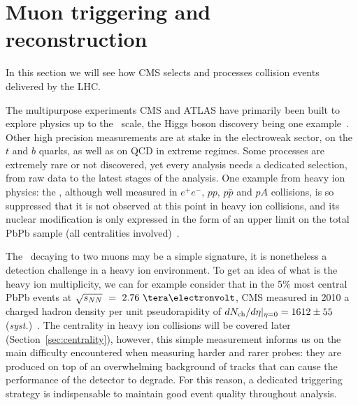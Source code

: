 \chapter{Muon triggering and reconstruction}
\label{chap:xmuons}
\minitoc
{}





In this section we will see how CMS selects and processes collision
events delivered by the LHC.


The multipurpose experiments CMS and ATLAS have primarily been built to explore physics up to the \TeV\
scale, the Higgs boson discovery being one example~\cite{Aad:2015zhl}. Other high precision measurements are at stake in 
the electroweak sector, on the $t$ and $b$ quarks, as well as on QCD in extreme regimes. Some processes are extremely rare or not
discovered, yet every analysis needs a dedicated selection, from raw data to the latest stages of the analysis. One example from heavy ion
physics: the \PgUc, although well measured in $e^+e^-$, $pp$, $p\bar{p}$ and $pA$ collisions, is so suppressed that it is not observed at
this point in heavy ion collisions, and its nuclear modification is only expressed in the form of an upper limit on the total PbPb sample
(all centralities involved)~\cite{11-011}.


The \PgUc\ decaying to two
muons may be a simple signature, it is nonetheless a
detection challenge in a heavy ion environment. To get an idea of what
is the heavy ion multiplicity, we can for example consider that in the 5\% most
central PbPb events at $\snn\ =~2.76~\TeV$, CMS measured in 2010 a charged
hadron density per unit pseudorapidity of $dN_{\rm ch}/d\eta
\vert_{\eta=0} = 1612 \pm 55$ (\textit{syst.})~\cite{pbpbmult}. The
centrality in heavy ion collisions will be covered later
(Section~\ref{sec:centrality}), however, this simple measurement informs
us on the main difficulty encountered when measuring harder and rarer
probes: they are produced on top of an overwhelming background of
tracks that can cause the performance of the detector to degrade.%
For this reason,
a dedicated triggering strategy is indispensable to maintain good
event quality throughout analysis. 



